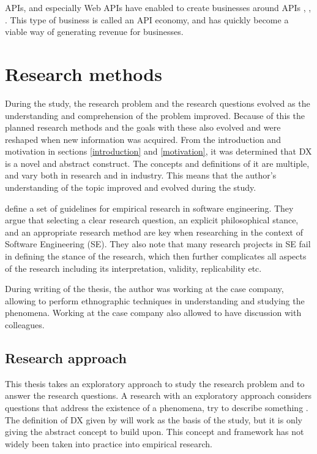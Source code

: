 \documentclass[english, 12pt, a4paper, sci, utf8, a-1b, online]{aaltothesis}
\begin{document}
APIs, and especially Web APIs have enabled to create businesses around APIs \citep{api-ecosystem}, \citep{web-api-economy}, \citep{moilanen2018api}. This type of business is called an API economy, and has quickly become a viable way of generating revenue for businesses.

\clearpage
\section{Research methods}

During the study, the research problem and the research questions evolved as the understanding and comprehension of the problem improved. Because of this the planned research methods and the goals with these also evolved and were reshaped when new information was acquired. From the introduction and motivation in sections \ref{introduction} and \ref{motivation}, it was determined that DX is a novel and abstract construct. The concepts and definitions of it are multiple, and vary both in research and in industry. This means that the author's understanding of the topic improved and evolved during the study.

\cite{easterbrook2008selecting} define a set of guidelines for empirical research in software engineering. They argue that selecting a clear research question, an explicit philosophical stance, and an appropriate research method are key when researching in the context of Software Engineering (SE). They also note that many research projects in SE fail in defining the stance of the research, which then further complicates all aspects of the research including its interpretation, validity, replicability etc.

During writing of the thesis, the author was working at the case company, allowing to perform ethnographic techniques in understanding and studying the phenomena. Working at the case company also allowed to have discussion with colleagues.

\subsection{Research approach}

This thesis takes an exploratory approach to study the research problem and to answer the research questions. A research with an exploratory approach considers questions that address the existence of a phenomena, try to describe something \citep{easterbrook2008selecting}. The definition of DX given by \cite{fagerholm-dx-concept-and-definition} will work as the basis of the study, but it is only giving the abstract concept to build upon. This concept and framework has not widely been taken into practice into empirical research.
\end{document}
